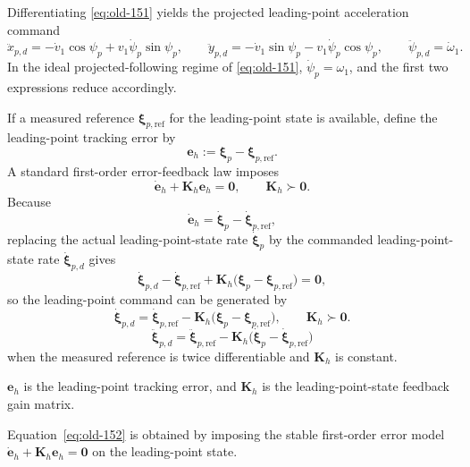 \documentclass[12pt,a4paper]{report}
\newcommand{\newsymbols}[1]{\par\noindent{}#1\par\vspace{0.35em}}
\newcommand{\formulaannotation}[1]{\par\noindent{}#1\par\vspace{0.35em}}
\begin{document}
Differentiating \eqref{eq:old-151} yields the projected leading-point acceleration command
\begin{equation}
\ddot{x}_{p,d} = -\dot{v}_1 \cos \psi_p + v_1 \dot{\psi}_p \sin \psi_p,
\qquad
\ddot{y}_{p,d} = -\dot{v}_1 \sin \psi_p - v_1 \dot{\psi}_p \cos \psi_p,
\qquad
\ddot{\psi}_{p,d} = \dot{\omega}_1.
\end{equation}
In the ideal projected-following regime of \eqref{eq:old-151}, $\dot{\psi}_p = \omega_1$, and the first two expressions reduce accordingly.

If a measured reference $\boldsymbol{\xi}_{p,\mathrm{ref}}$ for the leading-point state is available, define the leading-point tracking error by
\begin{equation}
\mathbf{e}_h := \boldsymbol{\xi}_p - \boldsymbol{\xi}_{p,\mathrm{ref}}.
\end{equation}
A standard first-order error-feedback law imposes
\begin{equation}
\dot{\mathbf{e}}_h + \mathbf{K}_h \mathbf{e}_h = \mathbf{0},
\qquad
\mathbf{K}_h \succ \mathbf{0}.
\end{equation}
Because
\begin{equation}
\dot{\mathbf{e}}_h =
\dot{\boldsymbol{\xi}}_p - \dot{\boldsymbol{\xi}}_{p,\mathrm{ref}},
\end{equation}
replacing the actual leading-point-state rate $\dot{\boldsymbol{\xi}}_p$ by the commanded leading-point-state rate $\dot{\boldsymbol{\xi}}_{p,d}$ gives
\begin{equation}
\dot{\boldsymbol{\xi}}_{p,d} -
\dot{\boldsymbol{\xi}}_{p,\mathrm{ref}} +
\mathbf{K}_h
\bigl(
\boldsymbol{\xi}_p - \boldsymbol{\xi}_{p,\mathrm{ref}}
\bigr)
= \mathbf{0},
\end{equation}
so the leading-point command can be generated by
\begin{equation}
\dot{\boldsymbol{\xi}}_{p,d} =
\dot{\boldsymbol{\xi}}_{p,\mathrm{ref}} -
\mathbf{K}_h
\bigl(
\boldsymbol{\xi}_p - \boldsymbol{\xi}_{p,\mathrm{ref}}
\bigr),
\qquad
\mathbf{K}_h \succ \mathbf{0}.
\label{eq:old-152}
\end{equation}
\begin{equation}
\ddot{\boldsymbol{\xi}}_{p,d} =
\ddot{\boldsymbol{\xi}}_{p,\mathrm{ref}} -
\mathbf{K}_h
\bigl(
\dot{\boldsymbol{\xi}}_p - \dot{\boldsymbol{\xi}}_{p,\mathrm{ref}}
\bigr)
\end{equation}
when the measured reference is twice differentiable and $\mathbf{K}_h$ is constant.
\newsymbols{$\mathbf{e}_h$ is the leading-point tracking error, and $\mathbf{K}_h$ is the leading-point-state feedback gain matrix.}
\formulaannotation{Equation~\eqref{eq:old-152} is obtained by imposing the stable first-order error model $\dot{\mathbf{e}}_h + \mathbf{K}_h \mathbf{e}_h = \mathbf{0}$ on the leading-point state.}
\end{document}
